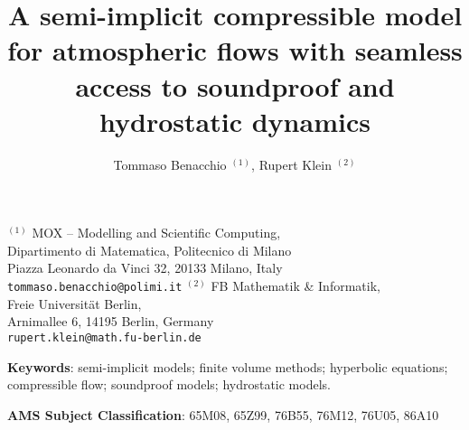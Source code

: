 \documentclass[12pt,a4paper]{article}
\theoremstyle{definition}
\begin{document}
\title{A semi-implicit compressible model for atmospheric flows with seamless access to soundproof and hydrostatic dynamics}
\author{Tommaso Benacchio $^{(1)}$, Rupert Klein $^{(2)}$}
\maketitle

\begin{center}
 
{\small
$^{(1)}$ MOX -- Modelling and Scientific Computing, \\
Dipartimento di Matematica, Politecnico di Milano \\
Piazza Leonardo da Vinci 32, 20133 Milano, Italy\\
{\tt tommaso.benacchio@polimi.it}
}
\vskip 0.5cm
{\small
$^{(2)}$ FB Mathematik \& Informatik, \\
Freie Universit\"at Berlin, \\
Arnimallee 6, 14195 Berlin, Germany\\
{\tt rupert.klein@math.fu-berlin.de}
}

\end{center}

\date{}


\noindent
{\bf Keywords}:   semi-implicit models; finite volume methods; hyperbolic equations; compressible flow;
soundproof models; hydrostatic models.  


\vspace*{0.5cm}

\noindent
{\bf AMS Subject Classification}:   65M08, 65Z99, 76B55, 76M12,  76U05, 86A10

\vspace*{0.5cm}

\pagebreak
\end{document}
